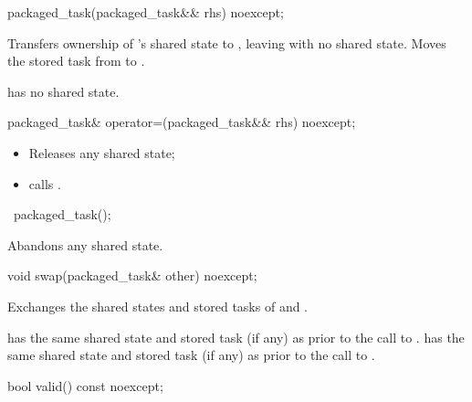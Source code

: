 %
\begin{itemdecl}
packaged_task(packaged_task&& rhs) noexcept;
\end{itemdecl}

\begin{itemdescr}
\pnum
\effects
Transfers ownership of
's shared state to , leaving  with no
shared state. Moves the stored task from  to .

\pnum
\ensures
{} has no shared state.
\end{itemdescr}

%
\begin{itemdecl}
packaged_task& operator=(packaged_task&& rhs) noexcept;
\end{itemdecl}

\begin{itemdescr}
\pnum
\effects
\begin{itemize}
\item
Releases any shared state;
\item
calls .
\end{itemize}
\end{itemdescr}

%
\begin{itemdecl}
~packaged_task();
\end{itemdecl}

\begin{itemdescr}
\pnum
\effects
Abandons any shared state.
\end{itemdescr}

%
\begin{itemdecl}
void swap(packaged_task& other) noexcept;
\end{itemdecl}

\begin{itemdescr}
\pnum
\effects
Exchanges the shared states and stored tasks of  and .

\pnum
\ensures
{} has the same shared state
and stored task (if any) as 
prior to the call to .  has the same shared state
and stored task (if any)
as  prior to the call to .
\end{itemdescr}

%
\begin{itemdecl}
bool valid() const noexcept;
\end{itemdecl}

